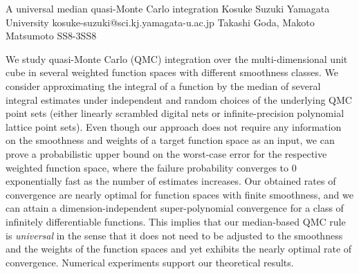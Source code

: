 \begin{talk}
  {A universal median quasi-Monte Carlo integration}%
  {Kosuke Suzuki}%
  {Yamagata University}%
  {kosuke-suzuki@sci.kj.yamagata-u.ac.jp}%
  {Takashi Goda, Makoto Matsumoto}%
{}{}{SS8-3}{SS8}


We study quasi-Monte Carlo (QMC) integration over the multi-dimensional unit cube in several weighted function spaces with different smoothness classes.
We consider approximating the integral of a function by the median of several integral estimates under independent and random choices of the underlying QMC point sets (either linearly scrambled digital nets or infinite-precision polynomial lattice point sets).
Even though our approach does not require any information on the smoothness and weights of a target function space as an input, we can prove a probabilistic upper bound on the worst-case error for the respective weighted function space, where the failure probability converges to 0 exponentially fast as the number of estimates increases.
Our obtained rates of convergence are nearly optimal for function spaces with finite smoothness, and we can attain a dimension-independent super-polynomial convergence for a class of infinitely differentiable functions.
This implies that our median-based QMC rule is \emph{universal} in the sense that it does not need to be adjusted to the smoothness and the weights of the function spaces and yet exhibits the nearly optimal rate of convergence. Numerical experiments support our theoretical results.
\end{talk}

